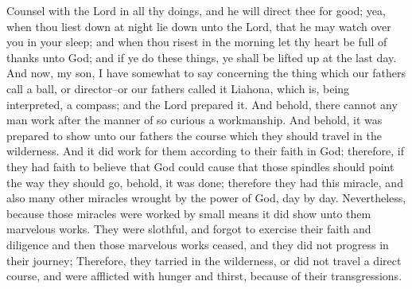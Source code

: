Counsel with the Lord in all thy doings, and he will direct thee for good; yea, when thou liest down at night lie down unto the Lord, that he may watch over you in your sleep; and when thou risest in the morning let thy heart be full of thanks unto God; and if ye do these things, ye shall be lifted up at the last day.
\bverse \iffalse And now, my son, I have somewhat to say concerning the thing which our fathers call a ball, or director--or our fathers called it Liahona, which is, being interpreted, a compass; and the Lord prepared it. \fi
And now, my son, I have somewhat to say concerning the thing which our fathers call a ball, or director--or our fathers called it Liahona, which is, being interpreted, a compass; and the Lord prepared it.
\bverse \iffalse And behold, there cannot any man work after the manner of so curious a workmanship. And behold, it was prepared to show unto our fathers the course which they should travel in the wilderness. \fi
And behold, there cannot any man work after the manner of so curious a workmanship. And behold, it was prepared to show unto our fathers the course which they should travel in the wilderness.
\bverse \iffalse And it did work for them according to their faith in God; therefore, if they had faith to believe that God could cause that those spindles should point the way they should go, behold, it was done; therefore they had this miracle, and also many other miracles wrought by the power of God, day by day. \fi
And it did work for them according to their faith in God; therefore, if they had faith to believe that God could cause that those spindles should point the way they should go, behold, it was done; therefore they had this miracle, and also many other miracles wrought by the power of God, day by day.
\bverse \iffalse Nevertheless, because those miracles were worked by small means it did show unto them marvelous works. They were slothful, and forgot to exercise their faith and diligence and then those marvelous works ceased, and they did not progress in their journey; \fi
Nevertheless, because those miracles were worked by small means it did show unto them marvelous works. They were slothful, and forgot to exercise their faith and diligence and then those marvelous works ceased, and they did not progress in their journey;
\bverse \iffalse Therefore, they tarried in the wilderness, or did not travel a direct course, and were afflicted with hunger and thirst, because of their transgressions. \fi
Therefore, they tarried in the wilderness, or did not travel a direct course, and were afflicted with hunger and thirst, because of their transgressions.
